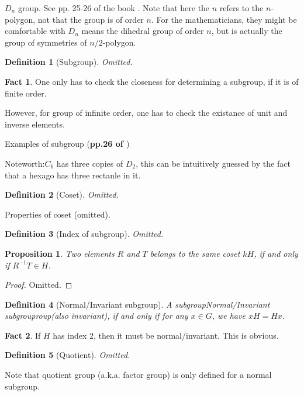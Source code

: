 \documentclass{article}
\numberwithin{equation}{subsection} %
\newtheorem{defi}{Definition}[section]
\newtheorem{prop}{Proposition}[section]
\theoremstyle{definition}
\newtheorem{fact}{Fact}[section]
\begin{document}
$D_n$ group. See pp. 25-26 of the book \cite{book}.
Note that here the $n$ refers to the $n$-polygon, not that the group is
of order $n$. For the mathematicians, they might be comfortable with
$D_n$ means the dihedral group of order $n$, but is actually the group of
symmetries of $n/2$-polygon.

\begin{defi}[Subgroup]
    Omitted.
\end{defi}
\begin{fact}
    One only has to check the closeness for determining a subgroup, if it
    is of finite order.

    However, for group of infinite order, one has to check the existance
    of unit and inverse elements.
\end{fact}
Examples of subgroup (\textbf{pp.26 of \cite{book}})

Noteworth:$C_6$ has three copies of $D_2$, this can be intuitively 
guessed by the fact that a hexago has three rectanle in it.

\begin{defi}[Coset]
    Omitted.
\end{defi}
Properties of coset (omitted).

\begin{defi}[Index of subgroup]
    Omitted.
\end{defi}

\begin{prop}
    Two elements $R$ and $T$ belongs to the same coset $kH$, if and only
    if $R^{-1}T\in H$.
\end{prop}
\begin{proof}
    Omitted.
\end{proof}
\begin{defi}[Normal/Invariant subgroup]
    A subgroupNormal/Invariant subgrouproup(also invariant), if and only
    if for any $x\in G$, we have $xH = Hx$.
\end{defi}
\begin{fact}
    If $H$ has index 2, then it must be normal/invariant. This is
    obvious.
\end{fact}
\begin{defi}[Quotient]
    Omitted.
\end{defi}
Note that quotient group (a.k.a. factor group) is only defined for a normal subgroup.
\end{document}
